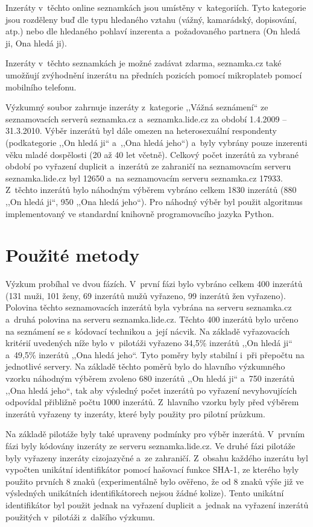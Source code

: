 \documentclass[a4paper, 12pt, notitlepage, oneside, numbers=noenddot]{report}
\begin{document}
Inzeráty v~těchto online seznamkách jsou umístěny v~kategoriích. Tyto
kategorie jsou rozděleny buď dle typu hledaného vztahu (vážný, kamarádský,
dopisování, atp.) nebo dle hledaného pohlaví inzerenta a~požadovaného
partnera (On hledá ji, Ona hledá ji).

Inzeráty v~těchto seznamkách je možné zadávat zdarma, seznamka.cz také
umožňují zvýhodnění inzerátu na předních pozicích pomocí mikroplateb
pomocí mobilního telefonu.

Výzkumný soubor zahrnuje inzeráty z~kategorie ,,Vážná seznámení`` ze
seznamovacích serverů seznamka.cz a~seznamka.lide.cz za období
1.4.2009 -- 31.3.2010.  Výběr in\-ze\-rá\-tů byl dále omezen na
heterosexuální respondenty (podkategorie ,,On hledá ji`` a~,,Ona hledá
jeho``) a~byly vybrány pouze inzerenti věku mladé dospělosti (20 až 40
let včetně).  Celkový počet inzerátů za vybrané období po vyřazení
duplicit a~inzerátů ze zahraničí na seznamovacím serveru
seznamka.lide.cz byl 12650 a~na seznamovacím serveru seznamka.cz
17933.  Z~těchto inzerátů bylo náhodným výběrem vybráno celkem 1830
inzerátů (880 ,,On hledá ji``, 950 ,,Ona hledá jeho``).  Pro náhodný
výběr byl použit algoritmus \citet{WichmannHill1982} implementovaný ve
standardní knihovně programovacího jazyka Python.

\section{Použité metody}
Výzkum probíhal ve dvou fázích. V~první fázi bylo vybráno celkem 400
inzerátů (131 muži, 101 ženy, 69 inzerátů mužů vyřazeno, 99 inzerátů
žen vyřazeno).  Polovina těchto seznamovacích inzerátů byla vybrána na
serveru seznamka.cz a~druhá polovina na serveru seznamka.lide.cz.
Těchto 400 inzerátů bylo určeno na seznámení se s~kódovací technikou
a~její nácvik.  Na základě vyřazovacích kritérií uvedených níže bylo
v~pilotáži vyřazeno 34,5\% inzerátů ,,On hledá ji`` a~49,5\% inzerátů
,,Ona hledá jeho``. Tyto poměry byly stabilní i~při přepočtu na
jednotlivé servery. Na základě těchto poměrů bylo do hlavního
výzkumného vzorku náhodným výběrem zvoleno 680 inzerátů ,,On hledá
ji`` a~750 inzerátů ,,Ona hledá jeho``, tak aby výsledný počet
inzerátů po vyřazení nevyhovujících odpovídal přibližně počtu 1000
inzerátů. Z~hlavního vzorku byly před výběrem inzerátů vyřazeny ty
inzeráty, které byly použity pro pilotní průzkum.

Na základě pilotáže byly také upraveny podmínky pro výběr
inzerátů. V~prvním fázi byly kódovány inzeráty ze serveru
seznamka.lide.cz. Ve druhé fázi pilotáže byly vyřazeny inzeráty
cizojazyčné a~ze zahraničí. Z~obsahu každého inzerátu byl vypočten
unikátní identifikátor pomocí hašovací funkce SHA-1, ze kterého byly
použito prvních 8 znaků (ex\-pe\-ri\-mentálně bylo ověřeno, že od 8 znaků
výše již ve výsledných unikátních identifikátorech nejsou žádné
kolize). Tento unikátní identifikátor byl použit jednak na vyřazení
duplicit a~jednak na vyřazení inzerátů použitých v~pilotáži z~dalšího
výzkumu.
\end{document}
